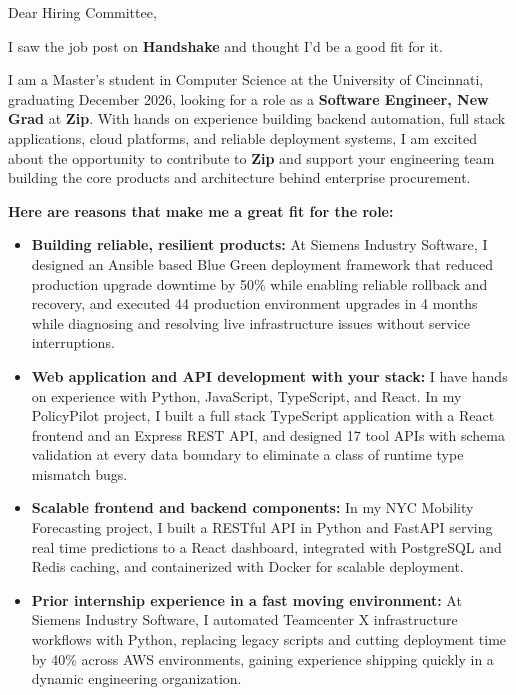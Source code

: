 \documentclass[11pt]{letter}
\date{}
\begin{document}
\begin{letter}{}

\opening{Dear Hiring Committee,}

I saw the job post on \textbf{Handshake} and thought I'd be a good fit for it.

I am a Master's student in Computer Science at the University of Cincinnati, graduating December 2026, looking for a role as a \textbf{Software Engineer, New Grad} at \textbf{Zip}. With hands on experience building backend automation, full stack applications, cloud platforms, and reliable deployment systems, I am excited about the opportunity to contribute to \textbf{Zip} and support your engineering team building the core products and architecture behind enterprise procurement.

\textbf{Here are reasons that make me a great fit for the role:}

\begin{itemize}[leftmargin=*, itemsep=0.45em]
    \item \textbf{Building reliable, resilient products:} At Siemens Industry Software, I designed an Ansible based Blue Green deployment framework that reduced production upgrade downtime by 50\% while enabling reliable rollback and recovery, and executed 44 production environment upgrades in 4 months while diagnosing and resolving live infrastructure issues without service interruptions.

    \item \textbf{Web application and API development with your stack:} I have hands on experience with Python, JavaScript, TypeScript, and React. In my PolicyPilot project, I built a full stack TypeScript application with a React frontend and an Express REST API, and designed 17 tool APIs with schema validation at every data boundary to eliminate a class of runtime type mismatch bugs.

    \item \textbf{Scalable frontend and backend components:} In my NYC Mobility Forecasting project, I built a RESTful API in Python and FastAPI serving real time predictions to a React dashboard, integrated with PostgreSQL and Redis caching, and containerized with Docker for scalable deployment.

    \item \textbf{Prior internship experience in a fast moving environment:} At Siemens Industry Software, I automated Teamcenter X infrastructure workflows with Python, replacing legacy scripts and cutting deployment time by 40\% across AWS environments, gaining experience shipping quickly in a dynamic engineering organization.
\end{itemize}


\end{letter}
\end{document}
